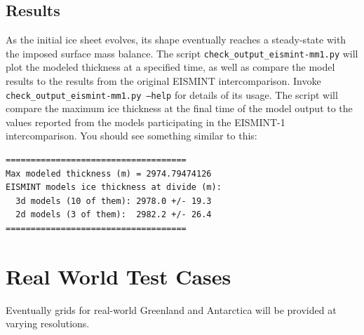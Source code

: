 \subsection{Results}
\label{subsecc:eismint_results}
As the initial ice sheet evolves, its shape eventually reaches a steady-state with the imposed surface mass balance.  
The script \texttt{check\_output\_eismint-mm1.py} will plot the modeled thickness at a specified time, 
as well as compare the model results to the results from the original EISMINT intercomparison.  
Invoke \texttt{check\_output\_eismint-mm1.py --help} for details of its usage.  
The script will compare the maximum ice thickness at the final time of the model output 
to the values reported from the models participating in the EISMINT-1 intercomparison.  
You should see something similar to this:

\begin{verbatim}
====================================
Max modeled thickness (m) = 2974.79474126
EISMINT models ice thickness at divide (m):
  3d models (10 of them): 2978.0 +/- 19.3
  2d models (3 of them):  2982.2 +/- 26.4
====================================
\end{verbatim}



\section{Real World Test Cases}
Eventually grids for real-world Greenland and Antarctica will be provided at varying resolutions.


